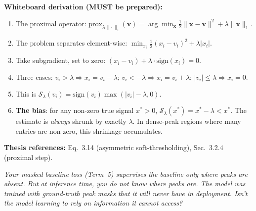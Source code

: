 \documentclass[11pt, letterpaper]{article}
\newcounter{qcounter}
\newcommand{\question}[1]{%
  \stepcounter{qcounter}%
  \begin{questionbox}[Q\theqcounter]%
    \itshape #1%
  \end{questionbox}%
}
\begin{document}
\begin{answerbox}
\textbf{Whiteboard derivation (MUST be prepared):}
\begin{enumerate}[nosep]
  \item The proximal operator: $\text{prox}_{\lambda\|\cdot\|_1}(\mathbf{v})
        = \arg\min_{\mathbf{x}} \frac{1}{2}\|\mathbf{x} - \mathbf{v}\|^2
        + \lambda\|\mathbf{x}\|_1$.
  \item The problem separates element-wise:
        $\min_{x_i} \frac{1}{2}(x_i - v_i)^2 + \lambda|x_i|$.
  \item Take subgradient, set to zero:
        $(x_i - v_i) + \lambda \cdot \text{sign}(x_i) = 0$.
  \item Three cases: $v_i > \lambda \Rightarrow x_i = v_i - \lambda$;
        $v_i < -\lambda \Rightarrow x_i = v_i + \lambda$;
        $|v_i| \le \lambda \Rightarrow x_i = 0$.
  \item This is $\mathcal{S}_\lambda(v_i)
        = \text{sign}(v_i)\max(|v_i| - \lambda, 0)$.
  \item \textbf{The bias}: for any non-zero true signal $x^* > 0$,
        $\mathcal{S}_\lambda(x^*) = x^* - \lambda < x^*$.  The
        estimate is \emph{always} shrunk by exactly $\lambda$.
        In dense-peak regions where many entries are non-zero,
        this shrinkage accumulates.
\end{enumerate}
\textbf{Thesis references:} Eq.~3.14 (asymmetric soft-thresholding), Sec.~3.2.4 (proximal step).
\end{answerbox}

\question{Your masked baseline loss (Term~5) supervises the baseline only
where peaks are absent.  But at inference time, you do not know
where peaks are.  The model was trained with ground-truth peak
masks that it will never have in deployment.  Isn't the model
learning to rely on information it cannot access?}
\end{document}

